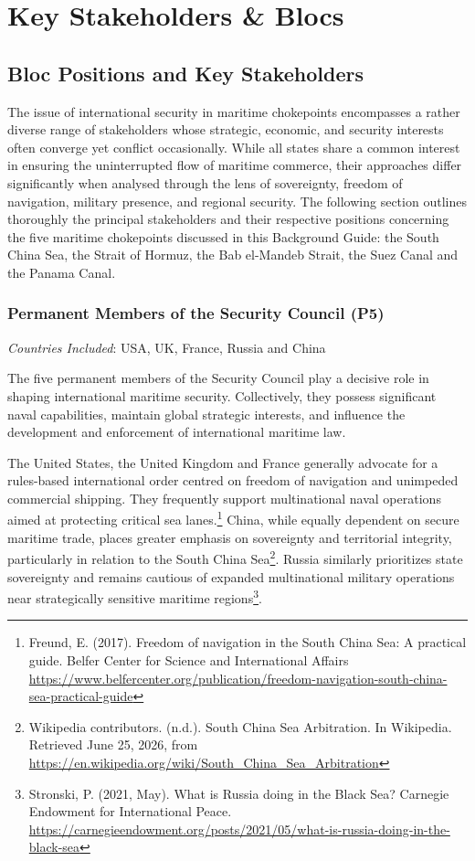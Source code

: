 \section{Key Stakeholders \& Blocs}

\subsection{Bloc Positions and Key Stakeholders}

The issue of international security in maritime chokepoints encompasses a rather diverse range of stakeholders whose strategic, economic, and security interests often converge yet conflict occasionally. While all states share a common interest in ensuring the uninterrupted flow of maritime commerce, their approaches differ significantly when analysed through the lens of sovereignty, freedom of navigation, military presence, and regional security. The following section outlines thoroughly the principal stakeholders and their respective positions concerning the five maritime chokepoints discussed in this Background Guide: the South China Sea, the Strait of Hormuz, the Bab el-Mandeb Strait, the Suez Canal and the Panama Canal.

\subsubsection{Permanent Members of the Security Council (P5)}

\emph{Countries Included}: USA, UK, France, Russia and China

The five permanent members of the Security Council play a decisive role in shaping international maritime security. Collectively, they possess significant naval capabilities, maintain global strategic interests, and influence the development and enforcement of international maritime law.

The United States, the United Kingdom and France generally advocate for a rules-based international order centred on freedom of navigation and unimpeded commercial shipping. They frequently support multinational naval operations aimed at protecting critical sea lanes.\footnote{Freund, E. (2017). Freedom of navigation in the South China Sea: A practical guide. Belfer Center for Science and International Affairs \url{https://www.belfercenter.org/publication/freedom-navigation-south-china-sea-practical-guide}} China, while equally dependent on secure maritime trade, places greater emphasis on sovereignty and territorial integrity, particularly in relation to the South China Sea\footnote{Wikipedia contributors. (n.d.). South China Sea Arbitration. In Wikipedia. Retrieved June 25, 2026, from \url{https://en.wikipedia.org/wiki/South_China_Sea_Arbitration}}. Russia similarly prioritizes state sovereignty and remains cautious of expanded multinational military operations near strategically sensitive maritime regions\footnote{Stronski, P. (2021, May). What is Russia doing in the Black Sea? Carnegie Endowment for International Peace. \url{https://carnegieendowment.org/posts/2021/05/what-is-russia-doing-in-the-black-sea}}.

